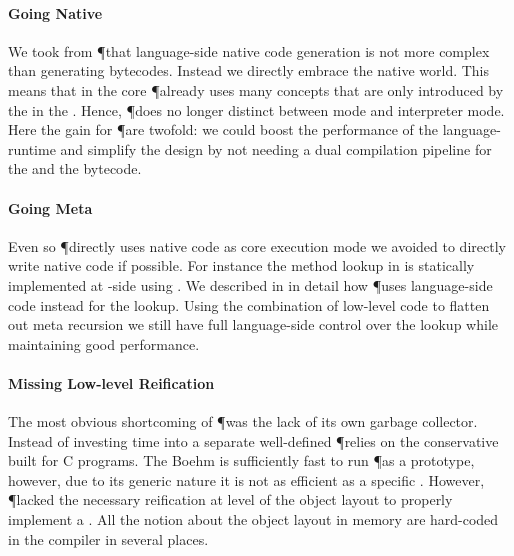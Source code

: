 \paragraph{Going Native}
We took from \P that language-side native code generation is not more complex than generating bytecodes.
Instead we directly embrace the native world.
This means that in the core \P already uses many concepts that are only introduced by the \JIT in the \Cog \VM.
Hence, \P does no longer distinct between \JIT mode and interpreter mode.
Here the gain for \P are twofold: we could boost the performance of the language-runtime and simplify the design by not needing a dual compilation pipeline for the \JIT and the bytecode.

\paragraph{Going Meta}
Even so \P directly uses native code as core execution mode we avoided to directly write native code if possible.
For instance the method lookup in \Cog is statically implemented at \VM-side using \Slang.
We described in  in detail how \P uses language-side code instead for the lookup.
Using the combination of low-level code to flatten out meta recursion we still have full language-side control over the lookup while maintaining good performance.

\paragraph{Missing Low-level Reification}
The most obvious shortcoming of \P was the lack of its own garbage collector.
Instead of investing time into a separate well-defined \GC \P relies on the conservative  built for C programs.
The Boehm \GC is sufficiently fast to run \P as a prototype, however, due to its generic nature it is not as efficient as a specific \GC.
However, \P lacked the necessary reification at level of the object layout to properly implement a \GC.
All the notion about the object layout in memory are hard-coded in the compiler in several places.

 \\
 \\
 \\
 \\
 \\
 \\

